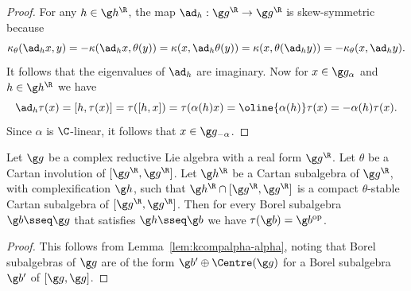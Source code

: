 \documentclass[12pt]{amsart}
\begin{document}
\begin{proof}
For any $h\in\g h^\R$, the map $\ad_h:\g g^\R\to\g g^\R$ is skew-symmetric because
\[
\kappa_\theta(\ad_hx,y)=
-\kappa(\ad_hx,\theta(y))=
\kappa(x,\ad_h\theta(y))=\kappa(x,\theta(\ad_hy))=-\kappa_\theta(x,\ad_hy).
\]
It follows that the eigenvalues of $\ad_h$ are imaginary.
Now for $x\in\g g_\alpha$ and  $h\in\g h^\R$ we have
\[
\ad_h\tau(x)=[h,\tau(x)]=\tau([h,x])=\tau(\alpha(h)x)=\oline{\alpha(h)}\tau(x)=
-\alpha(h)\tau(x).
\]
Since $\alpha$ is $\C$-linear, it follows that $x\in\g g_{-\alpha}$. 
\end{proof} 

 
 

\begin{lem}
\label{lem:tau(b)=bop}
Let $\g g$ be a complex reductive Lie algebra with a real form $\g g^\R$. Let $\theta$ be a Cartan involution of $[\g g^\R,\g g^\R]$. Let $\g h^\R$ be a Cartan subalgebra of $\g g^\R$, with complexification $\g h$, such that $\g h^\R\cap [\g g^\R,\g g^\R]$ is a compact $\theta$-stable Cartan subalgebra of $[\g g^\R,\g g^\R]$.
Then for every Borel subalgebra $\g b\sseq \g g$ that satisfies $\g h\sseq \g b$ we have $\tau(\g b)=\g b^\mathrm{op}$. 
 \end{lem}
\begin{proof}
This follows from Lemma~\ref{lem:kcompalpha-alpha}, noting that Borel subalgebras of $\g g$  are of the form $\g b'\oplus \Centre(\g g)$ for a Borel subalgebra $\g b'$ of $[\g g,\g g]$. 
\end{proof}
\end{document}
